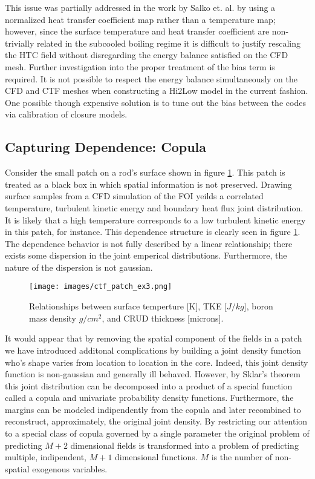 This issue was partially addressed in the work by Salko et. al. by using a normalized heat transfer coefficient map rather than a temperature map; however, since the surface temperature and heat transfer coefficient are non-trivially related in the subcooled boiling regime it is difficult to justify rescaling the HTC field without disregarding the energy balance satisfied on the CFD mesh.  Further investigation into the proper treatment of the bias term is required.  It is not possible to respect the energy balance simultaneously on the CFD and CTF meshes when constructing a Hi2Low model in the current fashion.  One possible though expensive solution is to tune out the bias between the codes via calibration of closure models.

\subsection{Capturing Dependence: Copula}

Consider the small patch on a rod's surface shown in figure \ref{fig:ctf_patch_dist}.  This patch is treated as a black box in which spatial information is not preserved. Drawing surface samples from a CFD simulation of the FOI yeilds a correlated temperature, turbulent kinetic energy and boundary heat flux joint distribution.  It is likely that a high temperature corresponds to a low turbulent kinetic energy in this patch, for instance.  This dependence structure is clearly seen in figure \ref{fig:ctf_patch_dist}.  The dependence behavior is not fully described by a linear relationship; there exists some dispersion in the joint emperical distributions.  Furthermore, the nature of the dispersion is not gaussian. \\

\begin{figure}[!htbp]
\centering
\texttt{[image: images/ctf\_patch\_ex3.png]}
\caption{Relationships between surface temperture [K], TKE [$J/kg$], boron mass density $g/cm^2$, and CRUD thickness [microns].}
\label{fig:ctf_patch_dist}
\end{figure}

It would appear that by removing the spatial component of the fields in a patch we have introduced additonal complications by building a joint density function who's shape varies from location to location in the core.  Indeed, this joint density function is non-gaussian and generally ill behaved.  However, by Sklar's theorem this joint distribution can be decomposed into a product of a special function called a copula and univariate probability density functions.  Furthermore, the margins can be modeled indipendently from the copula and later recombined to reconstruct, approximately, the original joint density.  By restricting our attention to a special class of copula governed by a single parameter the original problem of predicting $M+2$ dimensional fields is transformed into a problem of predicting multiple, indipendent, $M+1$ dimensional functions.  $M$ is the number of non-spatial exogenous variables. \\

